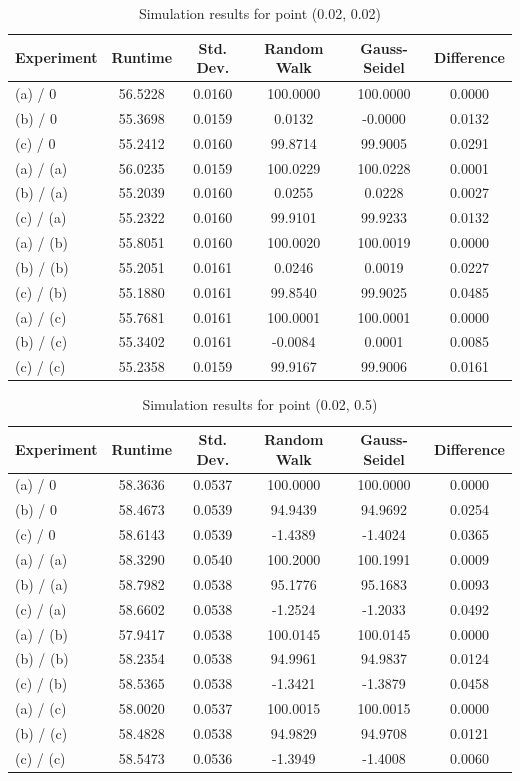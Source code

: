 \documentclass[english, 10pt,a4paper,oneside,headinclude,footinclude,BCOR5mm]{scrartcl}
\begin{document}
\begin{table}[h!]
\centering
\caption{Simulation results for point (0.02, 0.02)}
\label{tab:res2}
\begin{tabular}{lccccc}
\hline
Experiment & Runtime & Std. Dev. & Random Walk& Gauss-Seidel & Difference \\
\hline
(a) / 0 & 56.5228 & 0.0160 & 100.0000 & 100.0000 & 0.0000 \\
(b) / 0 & 55.3698 & 0.0159 & 0.0132 & -0.0000 & 0.0132 \\
(c) / 0 & 55.2412 & 0.0160 & 99.8714 & 99.9005 & 0.0291 \\
(a) / (a) & 56.0235 & 0.0159 & 100.0229 & 100.0228 & 0.0001 \\
(b) / (a) & 55.2039 & 0.0160 & 0.0255 & 0.0228 & 0.0027 \\
(c) / (a) & 55.2322 & 0.0160 & 99.9101 & 99.9233 & 0.0132 \\
(a) / (b) & 55.8051 & 0.0160 & 100.0020 & 100.0019 & 0.0000 \\
(b) / (b) & 55.2051 & 0.0161 & 0.0246 & 0.0019 & 0.0227 \\
(c) / (b) & 55.1880 & 0.0161 & 99.8540 & 99.9025 & 0.0485 \\
(a) / (c) & 55.7681 & 0.0161 & 100.0001 & 100.0001 & 0.0000 \\
(b) / (c) & 55.3402 & 0.0161 & -0.0084 & 0.0001 & 0.0085 \\
(c) / (c) & 55.2358 & 0.0159 & 99.9167 & 99.9006 & 0.0161 \\
\hline
\end{tabular}
\end{table}

\begin{table}[h!]
\centering
\caption{Simulation results for point (0.02, 0.5)}
\label{tab:res3}
\begin{tabular}{lccccc}
\hline
Experiment & Runtime & Std. Dev. & Random Walk  & Gauss-Seidel & Difference \\
\hline
(a) / 0 & 58.3636 & 0.0537 & 100.0000 & 100.0000 & 0.0000 \\
(b) / 0 & 58.4673 & 0.0539 & 94.9439 & 94.9692 & 0.0254 \\
(c) / 0 & 58.6143 & 0.0539 & -1.4389 & -1.4024 & 0.0365 \\
(a) / (a) & 58.3290 & 0.0540 & 100.2000 & 100.1991 & 0.0009 \\
(b) / (a) & 58.7982 & 0.0538 & 95.1776 & 95.1683 & 0.0093 \\
(c) / (a) & 58.6602 & 0.0538 & -1.2524 & -1.2033 & 0.0492 \\
(a) / (b) & 57.9417 & 0.0538 & 100.0145 & 100.0145 & 0.0000 \\
(b) / (b) & 58.2354 & 0.0538 & 94.9961 & 94.9837 & 0.0124 \\
(c) / (b) & 58.5365 & 0.0538 & -1.3421 & -1.3879 & 0.0458 \\
(a) / (c) & 58.0020 & 0.0537 & 100.0015 & 100.0015 & 0.0000 \\
(b) / (c) & 58.4828 & 0.0538 & 94.9829 & 94.9708 & 0.0121 \\
(c) / (c) & 58.5473 & 0.0536 & -1.3949 & -1.4008 & 0.0060 \\
\hline
\end{tabular}
\end{table}
\end{document}
